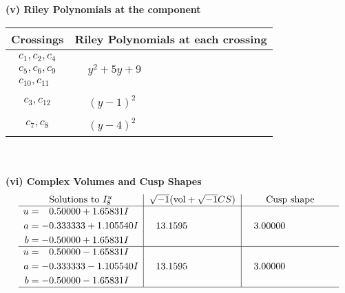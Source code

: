 \documentclass[1p]{elsarticle_modified}
\theoremstyle{definition}
\newcommand{\I}{\sqrt{-1}}
\begin{document}
\newpage\renewcommand{\arraystretch}{1}
\flushleft \textbf{(v) Riley Polynomials at the component}\newline \\
\begin{tabular}{m{50pt}|m{274pt}}
Crossings & \hspace{64pt}Riley Polynomials at each crossing \\
\hline $$\begin{aligned}c_{1},c_{2},c_{4}\\c_{5},c_{6},c_{9}\\c_{10},c_{11}\end{aligned}$$&$\begin{aligned}
&y^2+5 y+9
\end{aligned}$\\
\hline $$\begin{aligned}c_{3},c_{12}\end{aligned}$$&$\begin{aligned}
&(y-1)^2
\end{aligned}$\\
\hline $$\begin{aligned}c_{7},c_{8}\end{aligned}$$&$\begin{aligned}
&(y-4)^2
\end{aligned}$\\
\hline
\end{tabular}\\~\\
\newpage\flushleft \textbf{(vi) Complex Volumes and Cusp Shapes}
$$\begin{array}{c|c|c}  
\text{Solutions to }I^u_{8}& \I (\text{vol} + \sqrt{-1}CS) & \text{Cusp shape}\\
 \hline 
\begin{aligned}
u &= \phantom{-}0.50000 + 1.65831 I \\
a &= -0.333333 + 1.105540 I \\
b &= -0.50000 + 1.65831 I\end{aligned}
 & \phantom{-}13.1595\phantom{ +0.000000I} & \phantom{-}3.00000\phantom{ +0.000000I} \\ \hline\begin{aligned}
u &= \phantom{-}0.50000 - 1.65831 I \\
a &= -0.333333 - 1.105540 I \\
b &= -0.50000 - 1.65831 I\end{aligned}
 & \phantom{-}13.1595\phantom{ +0.000000I} & \phantom{-}3.00000\phantom{ +0.000000I}\\
 \hline 
 \end{array}$$\newpage\newpage\renewcommand{\arraystretch}{1}
\end{document}
